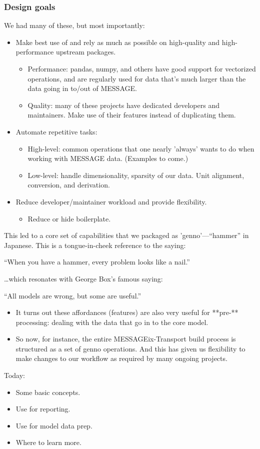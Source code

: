 \documentclass[12pt,aspectratio=169]{beamer}
\begin{document}
\begin{frame}[allowframebreaks]
\frametitle{Design goals}
We had many of these, but most importantly:
\begin{itemize}
  \item Make best use of and rely as much as possible on high-quality and high-performance upstream packages.
    \begin{itemize}
      \item Performance: pandas, numpy, and others have good support for vectorized operations, and are regularly used for data that's much larger than the data going in to/out of MESSAGE.
      \item Quality: many of these projects have dedicated developers and maintainers. Make use of their features instead of duplicating them.
    \end{itemize}
  \item Automate repetitive tasks:
    \begin{itemize}
      \item High-level: common operations that one nearly 'always' wants to do when working with MESSAGE data. (Examples to come.)
      \item Low-level: handle dimensionality, sparsity of our data. Unit alignment, conversion, and derivation.
    \end{itemize}
  \item Reduce developer/maintainer workload and provide flexibility.
    \begin{itemize}
      \item Reduce or hide boilerplate.
    \end{itemize}
\end{itemize}
This led to a core set of capabilities that we packaged as 'genno'—“hammer” in Japanese. This is a tongue-in-cheek reference to the saying:

“When you have a hammer, every problem looks like a nail.”

…which resonates with George Box's famous saying:

“All models are wrong, but some are useful.”

\begin{itemize}
  \item It turns out these affordances (features) are also very useful for **pre-** processing: dealing with the data that go in to the core model.
  \item So now, for instance, the entire MESSAGEix-Transport build process is structured as a set of genno operations. And this has given us flexibility to make changes to our workflow as required by many ongoing projects.
\end{itemize}

Today:
\begin{itemize}
  \item Some basic concepts.
  \item Use for reporting.
  \item Use for model data prep.
  \item Where to learn more.
\end{itemize}
\end{frame}
\end{document}
